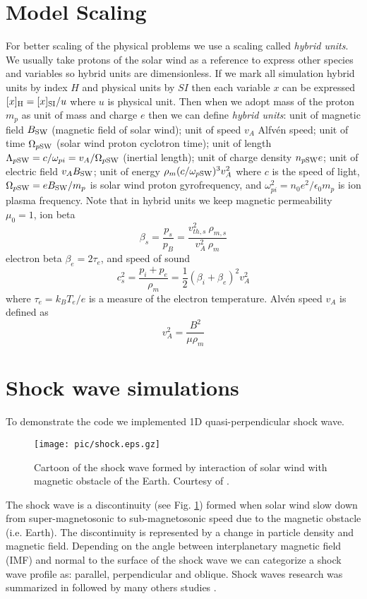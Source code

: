\documentclass[oneside,branding,toc,article]{sat}
\begin{document}
\section{Model Scaling}
For better scaling of the physical problems we use a scaling called
\emph{hybrid units}. We usually take protons of the solar wind as a reference
to express other species and variables so hybrid units are dimensionless. If we
mark all simulation hybrid units by index $H$ and physical units by $SI$ then
each variable $x$ can be expressed $[x]_{\rm H} = [x]_{\rm SI} / u$ where $u$
is physical unit. Then when we adopt mass of the proton $m_p$ as unit of mass
and charge $e$ then we can define \emph{hybrid units}: unit of magnetic field
$B_{\rm SW}$ (magnetic field of solar wind); unit of speed $v_A$ Alfv\'en
speed; unit of time $\Omega_{p \rm SW}$ (solar wind proton cyclotron time);
unit of length $\Lambda_{p \rm SW} = c/\omega_{pi} = v_A / \Omega_{p \rm SW}$
(inertial length); unit of charge density $n_{p \rm SW} e$; unit of electric
field $v_A B_{\rm SW}$; unit of energy $\rho_m (c/\omega_{p \rm SW})^3 v_A^2$
where $c$ is the speed of light, $\Omega_{p \rm SW} = e B_{\rm SW} / m_p$ is
solar wind proton gyrofrequency, and $\omega_{pi}^2 = n_0 e^2 / \epsilon_0 m_p$
is ion plasma frequency. Note that in hybrid units we keep magnetic
permeability $\mu_0 = 1$, ion beta
\begin{equation}
  \label{eq:betai}
  \beta_s = \frac{p_s}{p_B} = \frac{v_{th,s}^2 ~ \rho_{m,s}}{v_A^2 ~ \rho_m}
\end{equation}
electron beta $\beta_e = 2 \tau_e$, and speed of sound
\begin{equation}
  \label{eq:cs}
  c_s^2 = \frac{p_i + p_e}{\rho_m} = \frac{1}{2}(\beta_i + \beta_e)^2 v_A^2
\end{equation}
where $\tau_e = k_B T_e/e$ is a measure of the electron temperature. Alv\'en
speed $v_A$ is defined as
\begin{equation}
  \label{eq:va}
  v_A^2 = \frac{B^2}{\mu \rho_m}
\end{equation}

\section{Shock wave simulations}
To demonstrate the code we implemented 1D quasi-perpendicular shock wave. 
\begin{figure}[!h]
  \centering
  \texttt{[image: pic/shock.eps.gz]}
  \caption{Cartoon of the shock wave formed by interaction of solar wind with
    magnetic obstacle of the Earth. Courtesy of \cite{bt96}.}
  \label{fig:shock}
\end{figure}
The shock wave is a discontinuity (see Fig. \ref{fig:shock}) formed when solar
wind slow down from super-magnetosonic to sub-magnetosonic speed due to the
magnetic obstacle (i.e. Earth). The discontinuity is represented by a change in
particle density and magnetic field.  Depending on the angle between
interplanetary magnetic field (IMF) and normal to the surface of the shock wave
we can categorize a shock wave profile as: parallel, perpendicular and oblique.
Shock waves research was summarized in \cite{kennel85} followed by many others
studies \cite{winske85, thomas89, hema97}.
\end{document}

